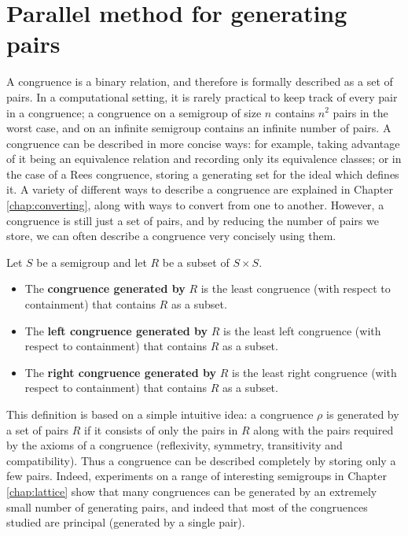 \chapter{Parallel method for generating pairs}
\label{chap:pairs}

A congruence is a binary relation, and therefore is formally described as a set
of pairs.  In a computational setting, it is rarely practical to keep track of
every pair in a congruence; a congruence on a semigroup of size $n$ contains
$n^2$ pairs in the worst case, and on an infinite semigroup contains an infinite
number of pairs.  A congruence can be described in more concise ways:
for example, taking advantage of it being an equivalence relation
and recording only its equivalence classes; or in the case of a Rees congruence,
storing a generating set for the ideal which defines it.  A variety of different
ways to describe a congruence are explained in Chapter \ref{chap:converting},
along with ways to convert from one to another.  However, a congruence is still just
a set of pairs, and by reducing the number of pairs we store, we can often describe a
congruence very concisely using them.

\begin{definition}
  Let $S$ be a semigroup and let $R$ be a subset of $S \times S$.
  \begin{itemize}
  \item 
    The \textbf{congruence generated by} $R$ is the least congruence
    (with respect to containment) that contains $R$ as a subset.
  \item
    The \textbf{left congruence generated by} $R$ is the least left congruence
    (with respect to containment) that contains $R$ as a subset.
  \item
    The \textbf{right congruence generated by} $R$ is the least right congruence
    (with respect to containment) that contains $R$ as a subset.
  \end{itemize}
\end{definition}

This definition is based on a simple intuitive idea:
a congruence $\rho$ is generated by a set of pairs $R$ if it consists
of only the pairs in $R$ along with the pairs required by the axioms of a
congruence (reflexivity, symmetry, transitivity and compatibility).  Thus a
congruence can be described completely by storing only a few pairs.
Indeed, experiments on a range of interesting semigroups in Chapter
\ref{chap:lattice} show that many congruences can be generated by an extremely
small number of generating pairs, and indeed that most of the congruences
studied are principal (generated by a single pair). %

